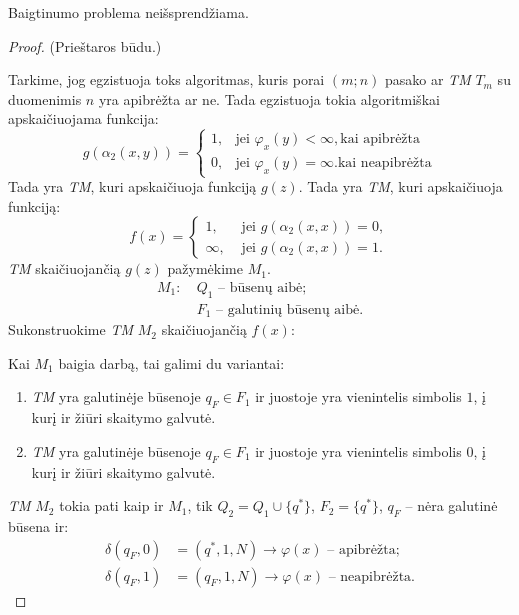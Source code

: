 \begin{prop}
  Baigtinumo problema neišsprendžiama.
  \begin{proof}
    (Prieštaros būdu.)

    Tarkime, jog egzistuoja toks algoritmas, kuris porai $(m; n)$ pasako
    ar \emph{TM} $T_{m}$ su duomenimis $n$ yra apibrėžta ar ne. Tada
    egzistuoja tokia algoritmiškai apskaičiuojama funkcija:
    \[
    g(\alpha_{2}(x,y)) =%
    \begin{cases}
      1, & \text{jei } \varphi_{x}(y) < \infty, \text{kai apibrėžta} \\
      0, & \text{jei } \varphi_{x}(y) = \infty. \text{kai neapibrėžta}
    \end{cases}
    \]
    Tada yra \emph{TM}, kuri apskaičiuoja funkciją $g(z)$.
    Tada yra \emph{TM}, kuri apskaičiuoja funkciją:
    \[
    f(x) =%
    \begin{cases}
      1, & \text{ jei } g(\alpha_{2}(x,x)) = 0, \\
      \infty, & \text{ jei } g(\alpha_{2}(x,x)) = 1.
    \end{cases}
    \]
    \emph{TM} skaičiuojančią $g(z)$ pažymėkime $M_{1}$.
    \begin{align*}
      M_{1}: & \: Q_{1} \text{ – būsenų aibė;} \\
      & \: F_{1} \text{ – galutinių būsenų aibė.}
    \end{align*}
    Sukonstruokime \emph{TM} $M_{2}$ skaičiuojančią $f(x)$:

    Kai $M_{1}$ baigia darbą, tai galimi du variantai:
    \begin{enumerate}
      \item \emph{TM} yra galutinėje būsenoje $q_{F} \in F_{1}$ ir 
        juostoje yra vienintelis simbolis $1$, į kurį ir žiūri 
        skaitymo galvutė.
      \item \emph{TM} yra galutinėje būsenoje $q_{F} \in F_{1}$ ir 
        juostoje yra vienintelis simbolis $0$, į kurį ir žiūri 
        skaitymo galvutė.
    \end{enumerate}
    \emph{TM} $M_{2}$ tokia pati kaip ir $M_{1}$, tik 
    $Q_{2} = Q_{1} \cup \{ q^{*} \}$, $F_{2} = \{ q^{*} \}$, 
    $q_{F}$ – nėra galutinė būsena ir:
    \begin{align*}
      \delta(q_{F},0) & = (q^{*}, 1, N) \to \varphi(x)\text{ – apibrėžta;}\\
      \delta(q_{F},1) & = (q_{F}, 1, N) \to \varphi(x)\text{ – neapibrėžta.}
    \end{align*}


\end{proof}
\end{prop}
